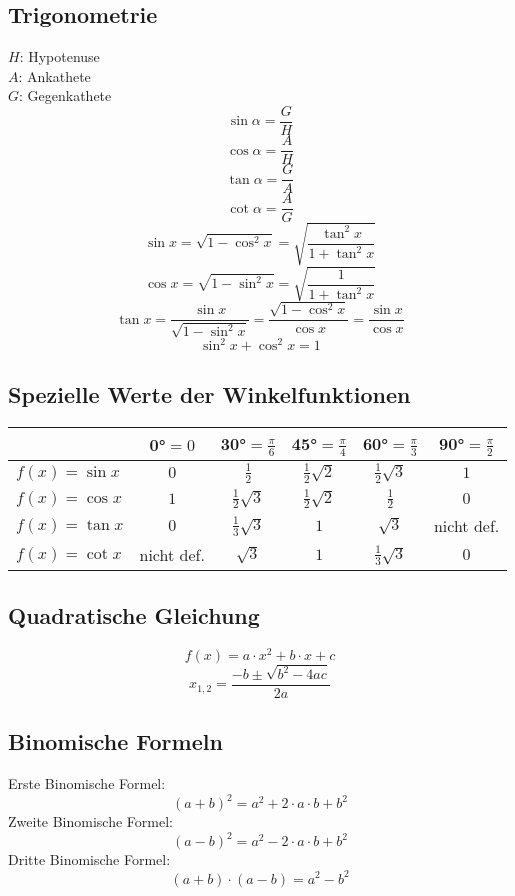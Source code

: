 \subsection{Trigonometrie}
$H$: Hypotenuse\\
$A$: Ankathete\\
$G$: Gegenkathete
\[ \boxed{\sin\alpha=\frac{G}{H}} \]
\[ \boxed{\cos\alpha=\frac{A}{H}} \]
\[ \boxed{\tan\alpha=\frac{G}{A}} \]
\[ \boxed{\cot\alpha=\frac{A}{G}} \]
\[ \boxed{\sin x = \sqrt{1-\cos^2x} = \sqrt{\frac{\tan^2x}{1+\tan^2x}}} \]
\[ \boxed{\cos x = \sqrt{1-\sin^2x} = \sqrt{\frac{1}{1+\tan^2x}}} \]
\[ \boxed{\tan x = \frac{\sin x}{\sqrt{1-\sin^2x}} = \frac{\sqrt{1-\cos^2x}}{\cos x} = \frac{\sin x}{\cos x}} \]
\[ \boxed{\sin^2 x + \cos^2 x = 1} \]

\subsection{Spezielle Werte der Winkelfunktionen}
\begin{tabular}{|l|c|c|c|c|c|}
\hline              & 0°$ = 0$ & 30°$ = \frac{\pi}{6}$ & 45°$ = \frac{\pi}{4}$ & 60°$ = \frac{\pi}{3}$ & 90°$ = \frac{\pi}{2}$ \\
\hline $f\left(x\right)=\sin x$ & $0$ & $\frac{1}{2}$ & $\frac{1}{2}\sqrt{2}$ & $\frac{1}{2}\sqrt{3}$ & $1$ \\
\hline $f\left(x\right)=\cos x$ & $1$ & $\frac{1}{2}\sqrt{3}$ & $\frac{1}{2}\sqrt{2}$ & $\frac{1}{2}$ & $0$ \\
\hline $f\left(x\right)=\tan x$ & $0$ & $\frac{1}{3}\sqrt{3}$ & $1$ & $\sqrt{3}$ & nicht def. \\
\hline $f\left(x\right)=\cot x$ & nicht def. & $\sqrt{3}$ & $1$ & $\frac{1}{3}\sqrt{3}$ & $0$ \\
\hline \end{tabular}

\subsection{Quadratische Gleichung}
\[ \boxed{f(x) = a \cdot x^2 + b \cdot x + c} \]
\[ \boxed{x_{1,2}=\frac{-b\pm\sqrt{b^2-4ac}}{2a}} \]

\subsection{Binomische Formeln}
Erste Binomische Formel: 
\[ \boxed{(a + b)^2 = a^2 + 2 \cdot a \cdot b + b^2} \]Zweite Binomische Formel: 
\[ \boxed{(a - b)^2 = a^2 - 2 \cdot a \cdot b + b^2} \]Dritte Binomische Formel: 
\[ \boxed{(a + b) \cdot (a - b) = a^2 - b^2} \]

